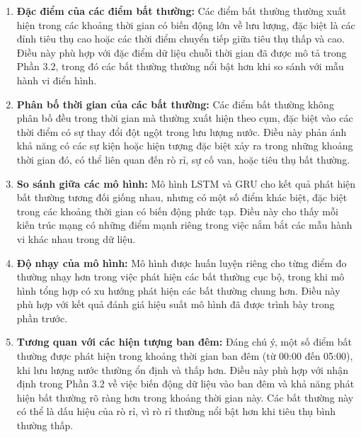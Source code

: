 \begin{enumerate}
    \item \textbf{Đặc điểm của các điểm bất thường:} Các điểm bất thường thường xuất hiện trong các khoảng thời gian có biến động lớn về lưu lượng, đặc biệt là các đỉnh tiêu thụ cao hoặc các thời điểm chuyển tiếp giữa tiêu thụ thấp và cao. Điều này phù hợp với đặc điểm dữ liệu chuỗi thời gian đã được mô tả trong Phần 3.2, trong đó các bất thường thường nổi bật hơn khi so sánh với mẫu hành vi điển hình.
    
    \item \textbf{Phân bố thời gian của các bất thường:} Các điểm bất thường không phân bố đều trong thời gian mà thường xuất hiện theo cụm, đặc biệt vào các thời điểm có sự thay đổi đột ngột trong lưu lượng nước. Điều này phản ánh khả năng có các sự kiện hoặc hiện tượng đặc biệt xảy ra trong những khoảng thời gian đó, có thể liên quan đến rò rỉ, sự cố van, hoặc tiêu thụ bất thường.
    
    \item \textbf{So sánh giữa các mô hình:} Mô hình LSTM và GRU cho kết quả phát hiện bất thường tương đối giống nhau, nhưng có một số điểm khác biệt, đặc biệt trong các khoảng thời gian có biến động phức tạp. Điều này cho thấy mỗi kiến trúc mạng có những điểm mạnh riêng trong việc nắm bắt các mẫu hành vi khác nhau trong dữ liệu.
    
    \item \textbf{Độ nhạy của mô hình:} Mô hình được huấn luyện riêng cho từng điểm đo thường nhạy hơn trong việc phát hiện các bất thường cục bộ, trong khi mô hình tổng hợp có xu hướng phát hiện các bất thường chung hơn. Điều này phù hợp với kết quả đánh giá hiệu suất mô hình đã được trình bày trong phần trước.
    
    \item \textbf{Tương quan với các hiện tượng ban đêm:} Đáng chú ý, một số điểm bất thường được phát hiện trong khoảng thời gian ban đêm (từ 00:00 đến 05:00), khi lưu lượng nước thường ổn định và thấp hơn. Điều này phù hợp với nhận định trong Phần 3.2 về việc biến động dữ liệu vào ban đêm và khả năng phát hiện bất thường rõ ràng hơn trong khoảng thời gian này. Các bất thường này có thể là dấu hiệu của rò rỉ, vì rò rỉ thường nổi bật hơn khi tiêu thụ bình thường thấp.
\end{enumerate}

